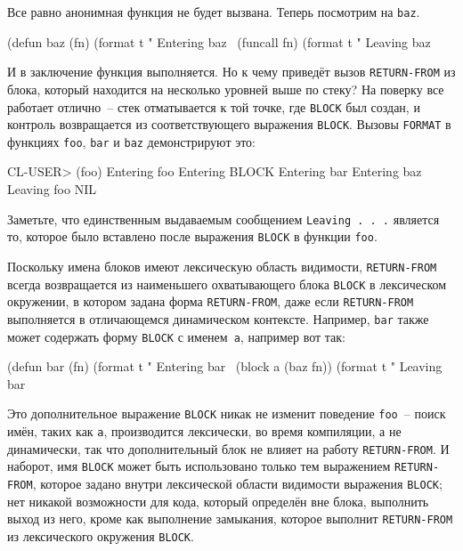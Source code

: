 Все равно анонимная функция не будет вызвана. Теперь посмотрим на \lstinline{baz}.

\begin{myverb}
(defun baz (fn)
  (format t "   Entering baz~%
  (funcall fn)
  (format t "   Leaving baz~%
\end{myverb}

И в заключение функция выполняется. Но к чему приведёт вызов \lstinline{RETURN-FROM} из блока,
который находится на несколько уровней выше по стеку? На поверку все работает отлично~--
стек отматывается к той точке, где \lstinline{BLOCK} был создан, и контроль возвращается из
соответствующего выражения \lstinline{BLOCK}. Вызовы \lstinline{FORMAT} в функциях \lstinline{foo},
\lstinline{bar} и \lstinline{baz} демонстрируют это:

\begin{myverb}
  CL-USER> (foo)
  Entering foo
   Entering BLOCK
    Entering bar
     Entering baz
  Leaving foo
  NIL
\end{myverb}

Заметьте, что единственным выдаваемым сообщением \lstinline{Leaving . . .} является то, которое
было вставлено после выражения \lstinline{BLOCK} в функции \lstinline{foo}.

Поскольку имена блоков имеют лексическую область видимости, \lstinline{RETURN-FROM} всегда
возвращается из наименьшего охватывающего блока \lstinline{BLOCK} в лексическом окружении, в
котором задана форма \lstinline{RETURN-FROM}, даже если \lstinline{RETURN-FROM} выполняется в
отличающемся динамическом контексте. Например, \lstinline{bar} также может содержать форму
\lstinline{BLOCK} с именем~\lstinline{a}, например вот так:

\begin{myverb}
(defun bar (fn)
  (format t "  Entering bar~%
  (block a (baz fn))
  (format t "  Leaving bar~%
\end{myverb}

Это дополнительное выражение \lstinline{BLOCK} никак не изменит поведение \lstinline{foo}~-- поиск
имён, таких как \lstinline{a}, производится лексически, во время компиляции, а не динамически,
так что дополнительный блок не влияет на работу \lstinline{RETURN-FROM}. И наборот, имя
\lstinline{BLOCK} может быть использовано только тем выражением \lstinline{RETURN-FROM}, которое
задано внутри лексической области видимости выражения \lstinline{BLOCK}; нет никакой
возможности для кода, который определён вне блока, выполнить выход из него, кроме как
выполнение замыкания, которое выполнит \lstinline{RETURN-FROM} из лексического окружения
\lstinline{BLOCK}.

